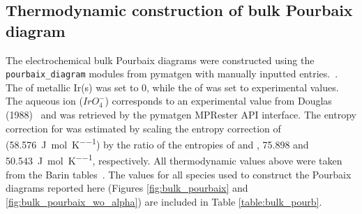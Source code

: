 

\begin{table}
\centering
\caption{\label{table:amorph_limit}
%
Density functional theory computed energetics of sampled amorphous phases for \IrOtwo and \IrOthree as per the procedure of Aykol ~\cite{Aykol2018}.
%
Here we report the raw DFT electronic energy per atom ($E_{DFT}$),
the enthalpy of formation (\DHf),
and the energy above the hull relative to the most stable polymorph of each stoichiometry (\rIrOtwo and \aIrOthree).
%
The most stable amorphous phase for each stoichiometry is bolded.
}

\end{table}








\subsection{Thermodynamic construction of bulk Pourbaix diagram}
%


%
%
The electrochemical bulk Pourbaix diagrams were constructed using the \texttt{pourbaix\_diagram} modules from pymatgen with manually inputted entries.~\cite{Ong2013}.
%
The \DGf of metallic Ir(s) was set to 0, while the \DGf of \rIrOtwo was set to experimental values.~\cite{Barin1995}
%
The aqueous ion ($IrO_{4}^{-}$) corresponds to an experimental value from Douglas (1988)~\cite{Adams1988} and was retrieved by the pymatgen MPRester API interface.
%
The entropy correction for \IrOthree was estimated by scaling the entropy correction of \IrOtwo (\SI{58.576}{\J\per\mole\per\kelvin}) by the ratio of the entropies of  and , \num{75.898} and \SI{50.543}{\J\per\mole\per\kelvin}, respectively.
%
All thermodynamic values above were taken from the Barin tables~\cite{Barin1995}.
%
The \DGf values for all species used to construct the Pourbaix diagrams reported here
(Figures \ref{fig:bulk_pourbaix} and \ref{fig:bulk_pourbaix_wo_alpha})
are included in Table \ref{table:bulk_pourb}.

